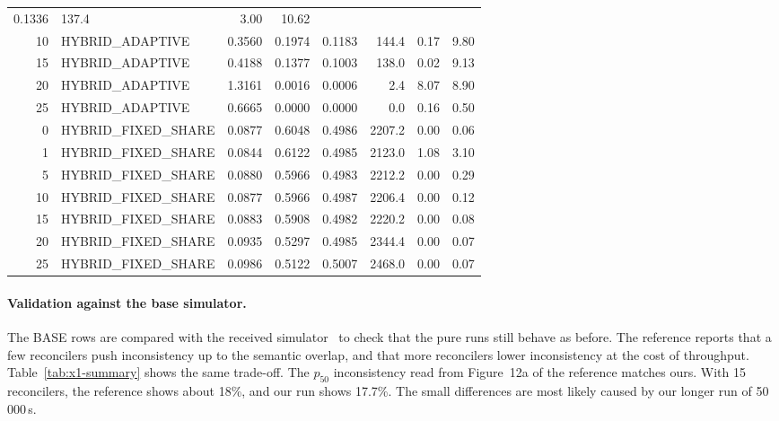\begin{table}[!htb]
\begin{tabular}{r l r r r r r r}
    0.1336                 & 137.4                  & 3.00        & 10.62
    \\
    10                     & HYBRID\_ADAPTIVE       & 0.3560      & 0.1974 &
    0.1183                 & 144.4                  & 0.17        & 9.80
    \\
    15                     & HYBRID\_ADAPTIVE       & 0.4188      & 0.1377 &
    0.1003                 & 138.0                  & 0.02        & 9.13
    \\
    20                     & HYBRID\_ADAPTIVE       & 1.3161      & 0.0016 &
    0.0006                 & 2.4                    & 8.07        & 8.90
    \\
    25                     & HYBRID\_ADAPTIVE       & 0.6665      & 0.0000 &
    0.0000                 & 0.0                    & 0.16        & 0.50
    \\
    \midrule
    0                      & HYBRID\_FIXED\_SHARE   & 0.0877      & 0.6048 &
    0.4986                 & 2207.2                 & 0.00        & 0.06
    \\
    1                      & HYBRID\_FIXED\_SHARE   & 0.0844      & 0.6122 &
    0.4985                 & 2123.0                 & 1.08        & 3.10
    \\
    5                      & HYBRID\_FIXED\_SHARE   & 0.0880      & 0.5966 &
    0.4983                 & 2212.2                 & 0.00        & 0.29
    \\
    10                     & HYBRID\_FIXED\_SHARE   & 0.0877      & 0.5966 &
    0.4987                 & 2206.4                 & 0.00        & 0.12
    \\
    15                     & HYBRID\_FIXED\_SHARE   & 0.0883      & 0.5908 &
    0.4982                 & 2220.2                 & 0.00        & 0.08
    \\
    20                     & HYBRID\_FIXED\_SHARE   & 0.0935      & 0.5297 &
    0.4985                 & 2344.4                 & 0.00        & 0.07
    \\
    25                     & HYBRID\_FIXED\_SHARE   & 0.0986      & 0.5122 &
    0.5007                 & 2468.0                 & 0.00        & 0.07
    \\
    \bottomrule
  \end{tabular}
\end{table}

\paragraph{Validation against the base simulator.}\label{sec:x1-validation} The
BASE rows are compared with the received simulator~\cite{zacouris2026mxs} to
check that the pure runs still behave as before. The reference reports that a
few reconcilers push inconsistency up to the semantic overlap, and that more
reconcilers lower inconsistency at the cost of throughput.
Table~\ref{tab:x1-summary} shows the same trade-off. The $p_{50}$ inconsistency
read from Figure~12a of the reference matches ours. With 15 reconcilers, the reference
shows about 18\%, and our run shows 17.7\%. The small differences are most
likely caused by our longer run of 50\,000\,s.

